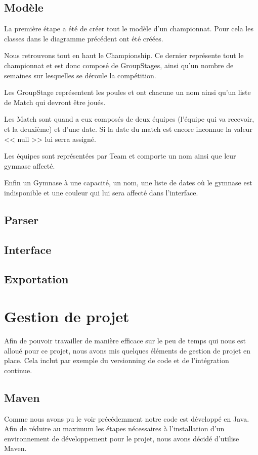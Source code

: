 \documentclass[final, noposter]{polytech/polytech}
\begin{document}
	\section{Modèle}
		
		La première étape a été de créer tout le modèle d'un championnat.
		Pour cela les classes dans le diagramme précédent ont été créées.
		
		Nous retrouvons tout en haut le Championship.
		Ce dernier représente tout le championnat et est donc composé de GroupStages, ainsi qu'un nombre de semaines sur lesquelles se déroule la compétition.
		
		Les GroupStage représentent les poules et ont chacune un nom ainsi qu'un liste de Match qui devront être joués.
		
		Les Match sont quand a eux composés de deux équipes (l'équipe qui va recevoir, et la deuxième) et d'une date.
		Si la date du match est encore inconnue la valeur << null >> lui serra assigné.
		
		Les équipes sont représentées par Team et comporte un nom ainsi que leur gymnase affecté.

		Enfin un Gymnase à une capacité, un nom, une liste de dates où le gymnase est indisponible et une couleur qui lui sera affecté dans l'interface.

	\section{Parser}
		
	
	\section{Interface}
	\section{Exportation}

\chapter{Gestion de projet}
	Afin de pouvoir travailler de manière efficace sur le peu de temps qui nous est alloué pour ce projet, nous avons mis quelques éléments de gestion de projet en place.
	Cela inclut par exemple du versionning de code et de l'intégration continue.
	
	\section{Maven\label{sec:maven}}
		Comme nous avons pu le voir précédemment notre code est développé en Java.
		Afin de réduire au maximum les étapes nécessaires à l'installation d'un environnement de développement pour le projet, nous avons décidé d'utilise Maven.
		
\end{document}
